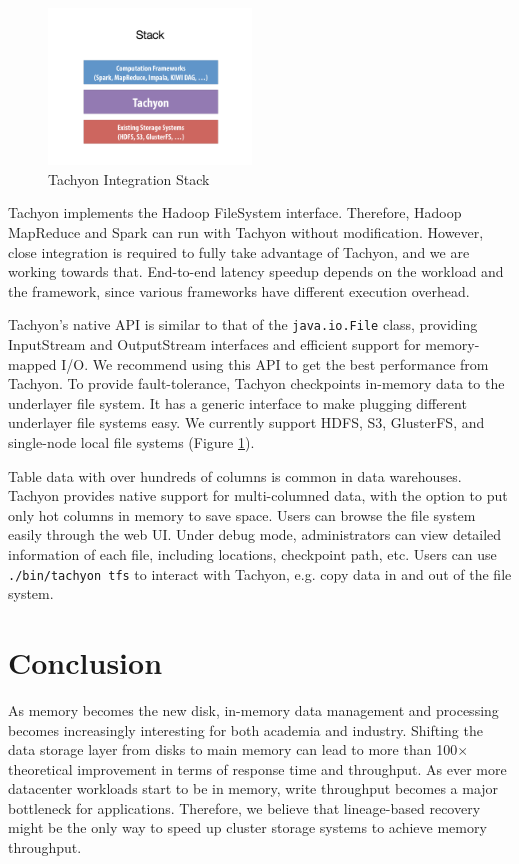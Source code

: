 \documentclass[twocolumn]{article}
\begin{document}
\begin{figure}[htb]
        \centering
        \includegraphics[width=0.48\textwidth]{stack.pdf}
        \caption{Tachyon Integration Stack}
        \label{fig:tachyon_stack}
\end{figure}

Tachyon implements the Hadoop FileSystem interface. Therefore, Hadoop MapReduce and Spark can run with Tachyon without modification. However, close integration is required to fully take advantage of Tachyon, and we are working towards that. End-to-end latency speedup depends on the workload and the framework, since various frameworks have different execution overhead.

Tachyon’s native API is similar to that of the \texttt{java.io.File} class, providing InputStream and OutputStream interfaces and efficient support for memory-mapped I/O. We recommend using this API to get the best performance from Tachyon.
To provide fault-tolerance, Tachyon checkpoints in-memory data to the underlayer file system. It has a generic interface to make plugging different underlayer file systems easy. We currently support HDFS, S3, GlusterFS, and single-node local file systems (Figure \ref{fig:tachyon_stack}).

Table data with over hundreds of columns is common in data warehouses. Tachyon provides native support for multi-columned data, with the option to put only hot columns in memory to save space.
Users can browse the file system easily through the web UI. Under debug mode, administrators can view detailed information of each file, including locations, checkpoint path, etc.
Users can use \texttt{./bin/tachyon tfs} to interact with Tachyon, e.g. copy data in and out of the file system.

\section{Conclusion}
As memory becomes the new disk, in-memory data management and processing becomes increasingly interesting for both academia and industry.
Shifting the data storage layer from disks to main memory can lead to more than 100$\times$ theoretical improvement in terms of response time and throughput. 
As ever more datacenter workloads start to be in memory, write throughput becomes a major bottleneck for applications. Therefore, we believe that lineage-based recovery might be the only way to speed up cluster storage systems to achieve memory throughput.
\end{document}
